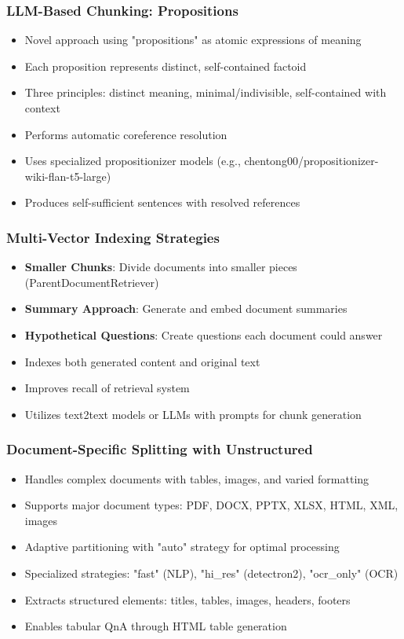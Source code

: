 \begin{frame}[fragile]\frametitle{LLM-Based Chunking: Propositions}
      \begin{itemize}
\item Novel approach using "propositions" as atomic expressions of meaning
\item Each proposition represents distinct, self-contained factoid
\item Three principles: distinct meaning, minimal/indivisible, self-contained with context
\item Performs automatic coreference resolution
\item Uses specialized propositionizer models (e.g., chentong00/propositionizer-wiki-flan-t5-large)
\item Produces self-sufficient sentences with resolved references
  \end{itemize}
\end{frame}

\begin{frame}[fragile]\frametitle{Multi-Vector Indexing Strategies}
      \begin{itemize}
\item \textbf{Smaller Chunks}: Divide documents into smaller pieces (ParentDocumentRetriever)
\item \textbf{Summary Approach}: Generate and embed document summaries
\item \textbf{Hypothetical Questions}: Create questions each document could answer
\item Indexes both generated content and original text
\item Improves recall of retrieval system
\item Utilizes text2text models or LLMs with prompts for chunk generation
  \end{itemize}
\end{frame}

\begin{frame}[fragile]\frametitle{Document-Specific Splitting with Unstructured}
      \begin{itemize}
\item Handles complex documents with tables, images, and varied formatting
\item Supports major document types: PDF, DOCX, PPTX, XLSX, HTML, XML, images
\item Adaptive partitioning with "auto" strategy for optimal processing
\item Specialized strategies: "fast" (NLP), "hi\_res" (detectron2), "ocr\_only" (OCR)
\item Extracts structured elements: titles, tables, images, headers, footers
\item Enables tabular QnA through HTML table generation
  \end{itemize}
\end{frame}

